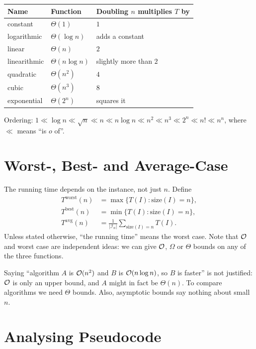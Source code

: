 \begin{center}
\begin{tabular}{lll}
\toprule
Name & Function & Doubling $n$ multiplies $T$ by\\
\midrule
constant & $\Theta(1)$ & $1$\\
logarithmic & $\Theta(\log n)$ & adds a constant\\
linear & $\Theta(n)$ & $2$\\
linearithmic & $\Theta(n \log n)$ & slightly more than $2$\\
quadratic & $\Theta(n^2)$ & $4$\\
cubic & $\Theta(n^3)$ & $8$\\
exponential & $\Theta(2^n)$ & squares it\\
\bottomrule
\end{tabular}
\end{center}

Ordering: $1 \ll \log n \ll \sqrt n \ll n \ll n \log n \ll n^2 \ll n^3 \ll 2^n \ll n!
\ll n^n$, where $\ll$ means ``is $o$ of''.

\section{Worst-, Best- and Average-Case}

The running time depends on the instance, not just $n$. Define
\begin{align*}
T^{\text{worst}}(n) &= \max\{T(I) : \text{size}(I) = n\},\\
T^{\text{best}}(n) &= \min\{T(I) : \text{size}(I) = n\},\\
T^{\text{avg}}(n) &= \frac{1}{|\mathcal I_n|}\sum_{\text{size}(I)=n} T(I).
\end{align*}
Unless stated otherwise, ``the running time'' means the worst case. Note that
$\mathcal{O}$ and worst case are independent ideas: we can give $\mathcal{O}$, $\Omega$ or
$\Theta$ bounds on any of the three functions.

\begin{important}
Saying ``algorithm $A$ is $\mathcal{O}(n^2)$ and $B$ is $\mathcal{O}(n \log n)$, so $B$ is
faster'' is not justified: $\mathcal{O}$ is only an upper bound, and $A$ might in fact
be $\Theta(n)$. To compare algorithms we need $\Theta$ bounds. Also, asymptotic
bounds say nothing about small $n$.
\end{important}

\section{Analysing Pseudocode}

